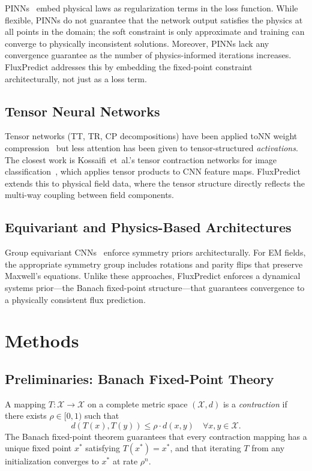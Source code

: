 \documentclass[11pt]{article}
\begin{document}
PINNs~\cite{raissi2019physics} embed physical laws as regularization terms in the loss function. While flexible, PINNs do not guarantee that the network output satisfies the physics at all points in the domain; the soft constraint is only approximate and training can converge to physically inconsistent solutions. Moreover, PINNs lack any convergence guarantee as the number of physics-informed iterations increases. FluxPredict addresses this by embedding the fixed-point constraint architecturally, not just as a loss term.

\subsection{Tensor Neural Networks}

Tensor networks (TT, TR, CP decompositions) have been applied toNN weight compression~\cite{novikov2015tensorizing,lebedev2014speeding} but less attention has been given to tensor-structured \emph{activations}. The closest work is Kossaifi~et~al.'s tensor contraction networks for image classification~\cite{kossaifi2020tensor}, which applies tensor products to CNN feature maps. FluxPredict extends this to physical field data, where the tensor structure directly reflects the multi-way coupling between field components.

\subsection{Equivariant and Physics-Based Architectures}

Group equivariant CNNs~\cite{cohen2016group,weiler2019general} enforce symmetry priors architecturally. For EM fields, the appropriate symmetry group includes rotations and parity flips that preserve Maxwell's equations. Unlike these approaches, FluxPredict enforces a dynamical systems prior---the Banach fixed-point structure---that guarantees convergence to a physically consistent flux prediction.

\section{Methods}

\subsection{Preliminaries: Banach Fixed-Point Theory}

A mapping $T: \mathcal{X} \to \mathcal{X}$ on a complete metric space $(\mathcal{X}, d)$ is a \emph{contraction} if there exists $\rho \in [0, 1)$ such that
\begin{equation}
    d(T(x), T(y)) \leq \rho \cdot d(x, y) \quad \forall x, y \in \mathcal{X}.
    \label{eq:contraction}
\end{equation}
The Banach fixed-point theorem guarantees that every contraction mapping has a unique fixed point $x^*$ satisfying $T(x^*) = x^*$, and that iterating $T$ from any initialization converges to $x^*$ at rate $\rho^n$.
\end{document}
